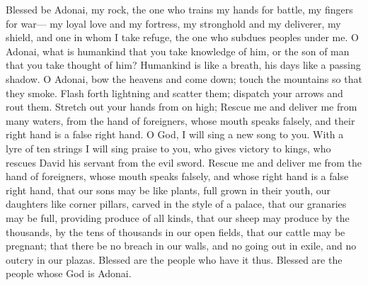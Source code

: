 \begin{biblechapter} %
 Blessed be Adonai, my rock, 
the one who trains my hands for battle, 
my fingers for war—
\verse my loyal love and my fortress, 
my stronghold and my deliverer, 
my shield, and one in whom I take refuge, 
the one who subdues peoples under me.
\verse O Adonai, what is humankind that you take knowledge of him, 
or the son of man that you take thought of him?
\verse Humankind is like a breath, 
his days like a passing shadow.
\verse O Adonai, bow the heavens and come down; 
touch the mountains so that they smoke.
\verse Flash forth lightning and scatter them; 
dispatch your arrows and rout them.
\verse Stretch out your hands from on high; 
Rescue me and deliver me from many waters, 
from the hand of foreigners,
\verse whose mouth speaks falsely, 
and their right hand is a false right hand.
\verse O God, I will sing a new song to you. 
With a lyre of ten strings I will sing praise to you,
\verse who gives victory to kings, 
who rescues David his servant 
from the evil sword.
\verse Rescue me and deliver me 
from the hand of foreigners, 
whose mouth speaks falsely, 
and whose right hand is a false right hand,
\verse that our sons may be like plants, 
full grown in their youth, 
our daughters like corner pillars, 
carved in the style of a palace,
\verse that our granaries may be full, 
providing produce of all kinds, 
that our sheep may produce by the thousands, 
by the tens of thousands in our open fields,
\verse that our cattle may be pregnant; 
that there be no breach in our walls, 
and no going out in exile, 
and no outcry in our plazas.
\verse Blessed are the people who have it thus. 
Blessed are the people whose God is Adonai.
\end{biblechapter}

